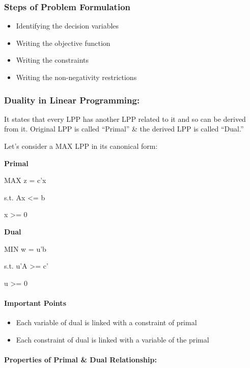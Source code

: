 \documentclass[]{article}
\providecommand{\tightlist}{%
  \setlength{\itemsep}{0pt}\setlength{\parskip}{0pt}}
\let\oldparagraph\paragraph
\renewcommand{\paragraph}[1]{\oldparagraph{#1}\mbox{}}
\begin{document}
\subsubsection{Steps of Problem
Formulation}\label{steps-of-problem-formulation}

\begin{itemize}
\tightlist
\item
  Identifying the decision variables
\item
  Writing the objective function
\item
  Writing the constraints
\item
  Writing the non-negativity restrictions
\end{itemize}

\subsubsection{Duality in Linear
Programming:}\label{duality-in-linear-programming}

It states that every LPP has another LPP related to it and so can be
derived from it. Original LPP is called ``Primal'' \& the derived LPP is
called ``Dual.''

Let's consider a MAX LPP in its canonical form:

\textbf{Primal}

MAX z = c'x

s.t. Ax \textless{}= b

x \textgreater{}= 0

\textbf{Dual}

MIN w = u'b

s.t. u'A \textgreater{}= c'

u \textgreater{}= 0

\paragraph{Important Points}\label{important-points}

\begin{itemize}
\tightlist
\item
  Each variable of dual is linked with a constraint of primal
\item
  Each constraint of dual is linked with a variable of the primal
\end{itemize}

\paragraph{Properties of Primal \& Dual
Relationship:}\label{properties-of-primal-dual-relationship}
\end{document}

